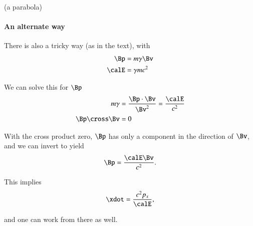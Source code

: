 {(a parabola)
%
\paragraph{An alternate way}
%
There is also a tricky way (as in the text), with
%
\begin{equation}\label{eqn:relativisticElectrodynamicsT3:160}
\begin{aligned}
\Bp &= m \gamma \Bv  \\
\calE &= \gamma m c^2
\end{aligned}
\end{equation}

We can solve this for \(\Bp\)
%
\begin{equation}\label{eqn:relativisticElectrodynamicsT3:1010}
\begin{aligned}
m \gamma &= \frac{\Bp \cdot \Bv}{\Bv^2} = \frac{\calE}{c^2} \\
\Bp \cross \Bv &= 0
\end{aligned}
\end{equation}

With the cross product zero, \(\Bp\) has only a component in the direction of \(\Bv\), and we can invert to yield
%
\begin{equation}\label{eqn:relativisticElectrodynamicsT3:180}
\Bp = \frac{\calE \Bv}{c^2}.
\end{equation}

This implies
%
\begin{equation}\label{eqn:relativisticElectrodynamicsT3:200}
\xdot = \frac{c^2 p_x}{\calE},
\end{equation}

and one can work from there as well.

} %
